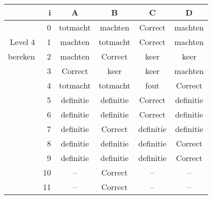 \begin{tabular}{ rr| c|c|c|c}\hline\hline
     & i & \textbf{A} & \textbf{B} & \textbf{C} & \textbf{D}\\\hline

&0&totmacht&machten&Correct\cellcolor[gray]{0.6}&machten\\
Level 4 & 1&machten&totmacht&Correct\cellcolor[gray]{0.6}&machten\\
bereken &2&machten&Correct\cellcolor[gray]{0.6}&keer&keer\\
&3&Correct\cellcolor[gray]{0.6}&keer&keer&machten\\
&4&totmacht&totmacht&fout&Correct\cellcolor[gray]{0.6}\\
&5&definitie&definitie&Correct\cellcolor[gray]{0.6}&definitie\\
&6&definitie&definitie&Correct\cellcolor[gray]{0.6}&definitie\\
&7&definitie&Correct\cellcolor[gray]{0.6}&definitie&definitie\\
&8&definitie&definitie&definitie&Correct\cellcolor[gray]{0.6}\\
&9&definitie&definitie&definitie&Correct\cellcolor[gray]{0.6}\\
&10&--&Correct\cellcolor[gray]{0.6}&--&--\\
&11&--&Correct\cellcolor[gray]{0.6}&--&--\\
\hline\end{tabular}\par\ \newline

